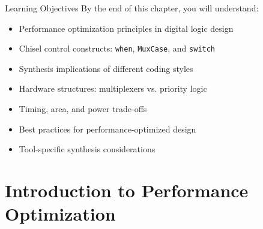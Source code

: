\begin{frame}{Learning Objectives}
By the end of this chapter, you will understand:
\begin{itemize}
\item Performance optimization principles in digital logic design
\item Chisel control constructs: \texttt{when}, \texttt{MuxCase}, and \texttt{switch}
\item Synthesis implications of different coding styles
\item Hardware structures: multiplexers vs. priority logic
\item Timing, area, and power trade-offs
\item Best practices for performance-optimized design
\item Tool-specific synthesis considerations
\end{itemize}
\end{frame}

\section{Introduction to Performance Optimization}

